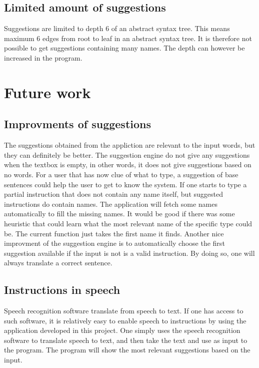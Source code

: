 \subsection*{Limited amount of suggestions}
Suggestions are limited to depth 6 of an abstract syntax tree. This means maximum 6 edges from root to leaf in an abstract syntax tree. It is therefore not possible to get suggestions containing many names. The depth can however be increased in the program.

\section{Future work}
\subsection*{Improvments of suggestions}
The suggestions obtained from the appliction are relevant to the input words, but they can definitely be better. The suggestion engine do not give any suggestions when the textbox is empty, in other words, it does not give suggestions based on no words. For a user that has now clue of what to type, a suggestion of base sentences could help the user to get to know the system.
\newline
\newline
If one starts to type a partial instruction that does not contain any name itself, but suggested instructions do contain names. The application will fetch some names automatically to fill the missing names. It would be good if there was some heuristic that could learn what the most relevant name of the specific type could be. The current function just takes the first name it finds.
\newline
\newline
Another nice improvment of the suggestion engine is to automatically choose the first suggestion available if the input is not is a valid instruction. By doing so, one will always translate a correct sentence.

\subsection*{Instructions in speech}
Speech recognition software translate from speech to text. If one has access to such software, it is relatively easy to enable speech to instructions by using the application developed in this project. One simply uses the speech recognition software to translate speech to text, and then take the text and use as input to the program. The program will show the most relevant suggestions based on the input.

